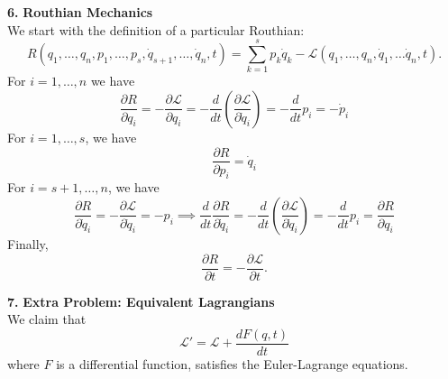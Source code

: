 \documentclass{article}
\theoremstyle{definition}
\newcommand{\p}{\partial}
\newcommand{\lag}{\mathcal{L}}
\newcommand{\f}[2]{\frac{#1}{#2}}
\newcommand{\lp}{\left(}
\newcommand{\rp}{\right)}
\begin{document}
\newpage
\noindent \textbf{6.} \textbf{Routhian Mechanics}\\


\noindent We start with the definition of a particular Routhian:
\begin{equation*}
R(q_1,\dots,q_n, p_1,\dots,p_s, \dot{q}_{s+1}, \dots, \dot{q}_{n},t) = \sum^s_{k=1} p_k \dot{q}_k  - \lag(q_1,\dots,q_n, \dot{q}_1,\dots \dot{q}_n,t).
\end{equation*}
For $i = 1,\dots,n$ we have
\begin{equation*}
\boxed{\f{\p R}{\p q_i}} = -\f{\p \lag}{\p q_i} = -\f{d}{dt} \lp \f{\p \lag}{\p \dot{q}_i} \rp = -\f{d}{dt}p_i = \boxed{-\dot{p}_i}
\end{equation*}
For $i=1,\dots,s$, we have
\begin{equation*}
\boxed{\f{\p R}{\p p_i} = \dot{q}_i}
\end{equation*}
For $i = s+1,\dots,n$, we have 
\begin{equation*}
\boxed{\f{\p R}{\p \dot{q}_i}} = -\f{\p \lag}{\p \dot{q}_i} = \boxed{-p_i} \implies \boxed{\f{d}{dt}\f{\p R}{\p \dot{q}_i}} = -\f{d}{dt}\lp \f{\p \lag}{\p \dot{q}_i} \rp = -\f{d}{dt} p_i = \boxed{\f{\p R}{\p q_i}}
\end{equation*}
Finally, 
\begin{equation*}
\f{\p R}{\p t} = -\f{\p \lag}{\p t}.
\end{equation*}

\newpage
\noindent \textbf{7.} \textbf{Extra Problem: Equivalent Lagrangians}\\


\noindent We claim that 
\begin{equation*}
\lag' = \lag + \f{dF(q,t)}{dt}
\end{equation*}
where $F$ is a differential function, satisfies the Euler-Lagrange equations.
\end{document}
